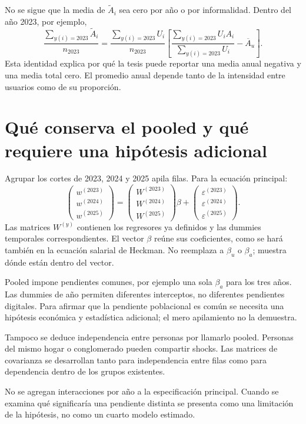 \documentclass[11pt,a4paper]{article}
\begin{document}
No se sigue que la media de $\widetilde A_i$ sea cero por año o por informalidad. Dentro del año 2023, por ejemplo,
\[
\frac{\sum_{y(i)=2023}\widetilde A_i}{n_{2023}}
=\frac{\sum_{y(i)=2023}U_i}{n_{2023}}
\left[
\frac{\sum_{y(i)=2023}U_iA_i}{\sum_{y(i)=2023}U_i}
-\overline A_u\right].
\]
Esta identidad explica por qué la tesis puede reportar una media anual negativa y una media total cero. El promedio anual depende tanto de la intensidad entre usuarios como de su proporción.

\clearpage
\section{Qué conserva el pooled y qué requiere una hipótesis adicional}

Agrupar los cortes de 2023, 2024 y 2025 apila filas. Para la ecuación principal:
\[
\begin{pmatrix}w^{(2023)}\\w^{(2024)}\\w^{(2025)}\end{pmatrix}
=
\begin{pmatrix}W^{(2023)}\\W^{(2024)}\\W^{(2025)}\end{pmatrix}\beta
+\begin{pmatrix}\varepsilon^{(2023)}\\\varepsilon^{(2024)}\\\varepsilon^{(2025)}\end{pmatrix}.
\]
Las matrices $W^{(y)}$ contienen los regresores ya definidos y las dummies temporales correspondientes. El vector $\beta$ reúne sus coeficientes, como se hará también en la ecuación salarial de Heckman. No reemplaza a $\beta_u$ o $\beta_a$; muestra dónde están dentro del vector.

Pooled impone pendientes comunes, por ejemplo una sola $\beta_a$ para los tres años. Las dummies de año permiten diferentes interceptos, no diferentes pendientes digitales. Para afirmar que la pendiente poblacional es común se necesita una hipótesis económica y estadística adicional; el mero apilamiento no la demuestra.

Tampoco se deduce independencia entre personas por llamarlo pooled. Personas del mismo hogar o conglomerado pueden compartir shocks. Las matrices de covarianza se desarrollan tanto para independencia entre filas como para dependencia dentro de los grupos existentes.

No se agregan interacciones por año a la especificación principal. Cuando se examina qué significaría una pendiente distinta se presenta como una limitación de la hipótesis, no como un cuarto modelo estimado.
\end{document}
